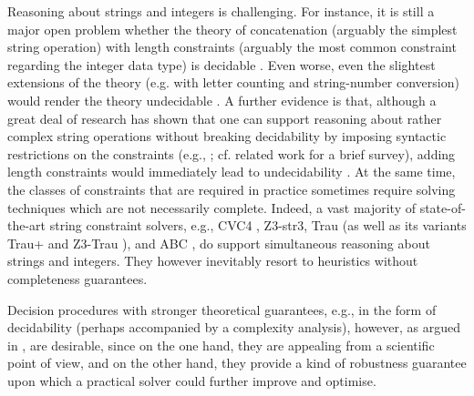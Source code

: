 Reasoning about strings and integers is challenging. For instance, it is still a major open problem whether the theory of concatenation (arguably the simplest string operation) with length constraints (arguably the most common constraint regarding the integer data type) is decidable \cite{Vijay-length}. Even worse, even the slightest extensions of the theory (e.g. with letter counting  and
string-number conversion) would render the theory undecidable \cite{buchi,GB16}. A further evidence is that, although a great deal of research has shown that one can support reasoning about rather complex string operations without breaking decidability by imposing syntactic restrictions on the constraints (e.g., \cite{CCH+18,CHL+19}; cf. related work for a brief survey), adding length constraints would immediately lead to undecidability \cite{CCH+18}. At the same time, the classes of constraints that are required in practice sometimes require solving techniques which are not necessarily complete. %
%
Indeed, a vast majority of  state-of-the-art string constraint solvers, e.g., CVC4 \cite{cvc4}, Z3-str3\cite{Z3-str3}, Trau \cite{Abdulla17} (as well as its variants Trau+ \cite{AbdullaA+19} and Z3-Trau \cite{Z3-trau}),  and ABC \cite{ABC}, do support simultaneous reasoning about strings and integers.
They however inevitably  resort to heuristics without completeness guarantees. 


Decision procedures with stronger theoretical guarantees, e.g., in the form of decidability (perhaps accompanied by a complexity analysis), however, as argued in \cite{CHL+19}, are desirable, since on the one hand, they are appealing from a scientific point of view, and on the other hand, they provide a kind of robustness guarantee upon which a practical solver could further improve and optimise.


